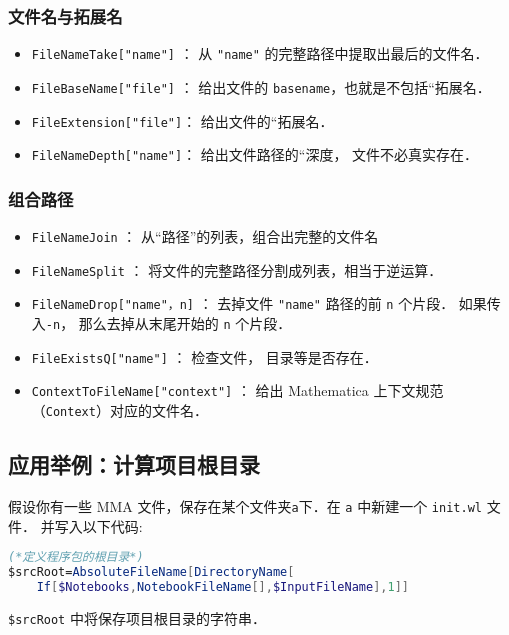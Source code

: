 \subsubsection{文件名与拓展名}

\begin{itemize}
\item \verb`FileNameTake["name"]` ： 从 \verb`"name"` 的完整路径中提取出最后的文件名．
\item \verb`FileBaseName["file"]` ： 给出文件的 \verb`basename`，也就是不包括“拓展名．
\item \verb`FileExtension["file"]`： 给出文件的“拓展名．
\item \verb`FileNameDepth["name"]`： 给出文件路径的“深度， 文件不必真实存在．
\end{itemize}

\subsubsection{组合路径}

\begin{itemize}
\item \verb`FileNameJoin` ： 从“路径”的列表，组合出完整的文件名
\item \verb`FileNameSplit` ： 将文件的完整路径分割成列表，相当于逆运算．
\item \verb`FileNameDrop["name"，n]` ： 去掉文件 \verb`"name"` 路径的前 \verb`n` 个片段． 
如果传入\verb`-n`， 那么去掉从末尾开始的 \verb`n` 个片段．
\item \verb`FileExistsQ["name"]`  ： 检查文件， 目录等是否存在．
\item \verb`ContextToFileName["context"]`  ： 给出 Mathematica 上下文规范（\verb`Context`）对应的文件名．
\end{itemize}

\subsection{应用举例：计算项目根目录}

假设你有一些 MMA 文件，保存在某个文件夹\verb`a`下．在 \verb`a` 中新建一个 \verb`init.wl` 文件．
并写入以下代码:
\begin{lstlisting}[language=mathematica]
(*定义程序包的根目录*)
$srcRoot=AbsoluteFileName[DirectoryName[
    If[$Notebooks,NotebookFileName[],$InputFileName],1]]
\end{lstlisting}

\verb`$srcRoot` 中将保存项目根目录的字符串．

